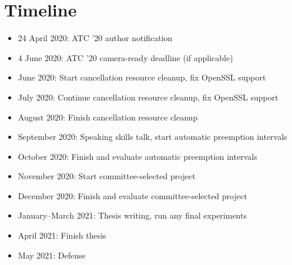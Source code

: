 \documentclass[12pt,letterpaper]{book}
\begin{document}
\section{Timeline}

\begin{itemize}
\item 24 April 2020: ATC '20 author notification
\item 4 June 2020: ATC '20 camera-ready deadline (if applicable)
\item June 2020: Start cancellation resource cleanup, fix OpenSSL support
\item July 2020: Continue cancellation resource cleanup, fix OpenSSL support
\item August 2020: Finish cancellation resource cleanup
\item September 2020: Speaking skills talk, start automatic preemption intervals
\item October 2020: Finish and evaluate automatic preemption intervals
\item November 2020: Start committee-selected project
\item December 2020: Finish and evaluate committee-selected project
\item January--March 2021: Thesis writing, run any final experiments
\item April 2021: Finish thesis
\item May 2021: Defense
\end{itemize}


\cleardoublepage
{}

\end{document}
